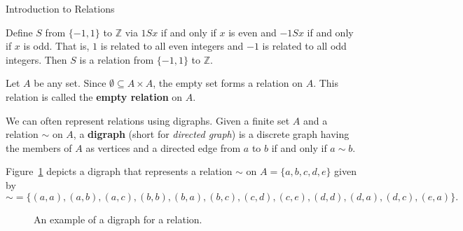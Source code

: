 \begin{section}{Introduction to Relations}
\begin{example}
Define $S$ from $\{-1,1\}$ to $\mathbb{Z}$ via $1Sx$ if and only if $x$ is even and $-1Sx$ if and only if $x$ is odd.  That is, $1$ is related to all even integers and $-1$ is related to all odd integers.  Then $S$ is a relation from $\{-1,1\}$ to $\mathbb{Z}$.
\end{example}

\begin{example}
Let $A$ be any set.  Since $\emptyset \subseteq A\times A$, the empty set forms a relation on $A$. This relation is called the \textbf{empty relation} on $A$.
\end{example}

We can often represent relations using digraphs.  Given a finite set $A$ and a relation $\sim$ on $A$, a \textbf{digraph} (short for \emph{directed graph}) is a discrete graph having the members of $A$ as vertices and a directed edge from $a$ to $b$ if and only if $a\sim b$.

\begin{example}\label{ex:digraph}
Figure~\ref{fig:digraph} depicts a digraph that represents a relation $\sim$ on $A=\{a,b,c,d,e\}$ given by
\[
{\sim}=\{(a,a),(a,b),(a,c),(b,b),(b,a),(b,c),(c,d),(c,e),(d,d),(d,a),(d,c),(e,a)\}.
\]

\begin{figure}[h!]
\begin{center}
\caption{An example of a digraph for a relation.}\label{fig:digraph}
\end{center}
\end{figure}


\end{example}
\end{section}
